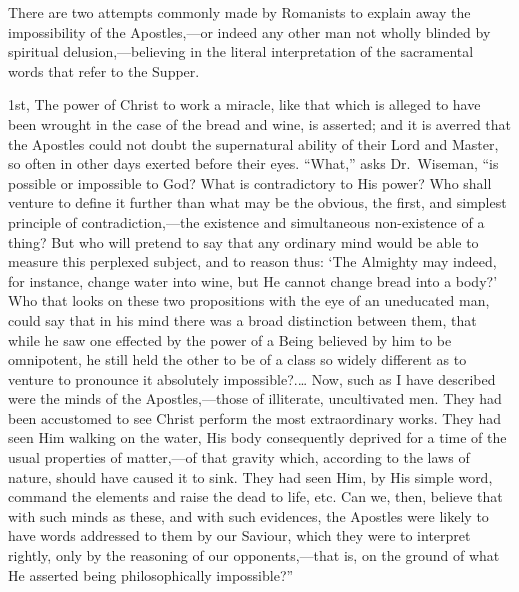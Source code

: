 \documentclass[]{book}
\begin{document}
There are two attempts commonly made by Romanists to explain away the impossibility of the Apostles,---or indeed any other man not wholly blinded by spiritual delusion,---believing in the literal interpretation of the sacramental words that refer to the Supper.

1st, The power of Christ to work a miracle, like that which is alleged to have been wrought in the case of the bread and wine, is asserted; and it is averred that the Apostles could not doubt the supernatural ability of their Lord and Master, so often in other days exerted before their eyes. ``What,'' asks Dr.~Wiseman, ``is possible or impossible to God? What is contradictory to His power? Who shall venture to define it further than what may be the obvious, the first, and simplest principle of contradiction,---the existence and simultaneous non-existence of a thing? But who will pretend to say that any ordinary mind would be able to measure this perplexed subject, and to reason thus: `The Almighty may indeed, for instance, change water into wine, but He cannot change bread into a body?' Who that looks on these two propositions with the eye of an uneducated man, could say that in his mind there was a broad distinction between them, that while he saw one effected by the power of a Being believed by him to be omnipotent, he still held the other to be of a class so widely different as to venture to pronounce it absolutely impossible?.\ldots{} Now, such as I have described were the minds of the Apostles,---those of illiterate, uncultivated men. They had been accustomed to see Christ perform the most extraordinary works. They had seen Him walking on the water, His body consequently deprived for a time of the usual properties of matter,---of that gravity which, according to the laws of nature, should have caused it to sink. They had seen Him, by His simple word, command the elements and raise the dead to life, etc. Can we, then, believe that with such minds as these, and with such evidences, the Apostles were likely to have words addressed to them by our Saviour, which they were to interpret rightly, only by the reasoning of our opponents,---that is, on the ground of what He asserted being philosophically impossible?''
\end{document}
